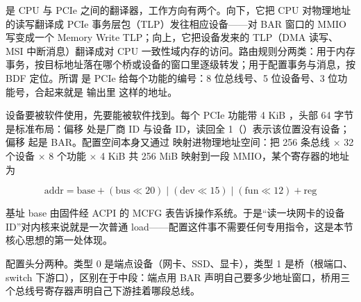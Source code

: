 

是 CPU 与 PCIe 之间的翻译器，工作方向有两个。向下，它把 CPU 对物理地址的读写翻译成 PCIe 事务层包（TLP）发往相应设备——对 BAR 窗口的 MMIO 写变成一个 Memory Write TLP；向上，它把设备发来的 TLP（DMA 读写、MSI 中断消息）翻译成对 CPU 一致性域内存的访问。路由规则分两类：用于内存事务，按目标地址落在哪个桥或设备的窗口里逐级转发；用于配置事务与消息，按 BDF 定位。所谓  是 PCIe 给每个功能的编号：8 位总线号、5 位设备号、3 位功能号，合起来就是  输出里  这样的地址。

设备要被软件使用，先要能被软件找到。每个 PCIe 功能带 4 KiB ，头部 64 字节是标准布局：偏移  处是厂商 ID 与设备 ID，读回全 1（）表示该位置没有设备；偏移  起是 BAR。配置空间本身又通过  映射进物理地址空间：把 256 条总线 $\times$ 32 个设备 $\times$ 8 个功能 $\times$ 4 KiB 共 256 MiB 映射到一段 MMIO，某个寄存器的地址为

\[
\text{addr} = \text{base} + (\text{bus}\ll 20) \mathbin{|} (\text{dev}\ll 15) \mathbin{|} (\text{fun}\ll 12) + \text{reg}
\]

基址 base 由固件经 ACPI 的 MCFG 表告诉操作系统。于是“读一块网卡的设备 ID”对内核来说就是一次普通 load——配置这件事不需要任何专用指令，这是本节核心思想的第一处体现。

配置头分两种。类型 0 是端点设备（网卡、SSD、显卡），类型 1 是桥（根端口、switch 下游口），区别在于中段：端点用 BAR 声明自己要多少地址窗口，桥用三个总线号寄存器声明自己下游挂着哪段总线。

